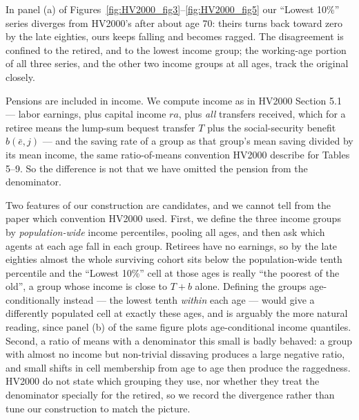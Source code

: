 \documentclass[11pt,fleqn]{article}
\begin{document}
In panel (a) of Figures~\ref{fig:HV2000_fig3}--\ref{fig:HV2000_fig5} our ``Lowest 10\%'' series diverges from HV2000's after about age 70: theirs turns back toward zero by the late eighties, ours keeps falling and becomes ragged. The disagreement is confined to the retired, and to the lowest income group; the working-age portion of all three series, and the other two income groups at all ages, track the original closely.

Pensions are included in income. We compute income as in HV2000 Section 5.1 --- labor earnings, plus capital income $ra$, plus \emph{all} transfers received, which for a retiree means the lump-sum bequest transfer $T$ plus the social-security benefit $\hat b(\bar e,j)$ --- and the saving rate of a group as that group's mean saving divided by its mean income, the same ratio-of-means convention HV2000 describe for Tables 5--9. So the difference is not that we have omitted the pension from the denominator.

Two features of our construction are candidates, and we cannot tell from the paper which convention HV2000 used. First, we define the three income groups by \emph{population-wide} income percentiles, pooling all ages, and then ask which agents at each age fall in each group. Retirees have no earnings, so by the late eighties almost the whole surviving cohort sits below the population-wide tenth percentile and the ``Lowest 10\%'' cell at those ages is really ``the poorest of the old'', a group whose income is close to $T + b$ alone. Defining the groups age-conditionally instead --- the lowest tenth \emph{within} each age --- would give a differently populated cell at exactly these ages, and is arguably the more natural reading, since panel (b) of the same figure plots age-conditional income quantiles. Second, a ratio of means with a denominator this small is badly behaved: a group with almost no income but non-trivial dissaving produces a large negative ratio, and small shifts in cell membership from age to age then produce the raggedness. HV2000 do not state which grouping they use, nor whether they treat the denominator specially for the retired, so we record the divergence rather than tune our construction to match the picture.
\end{document}
